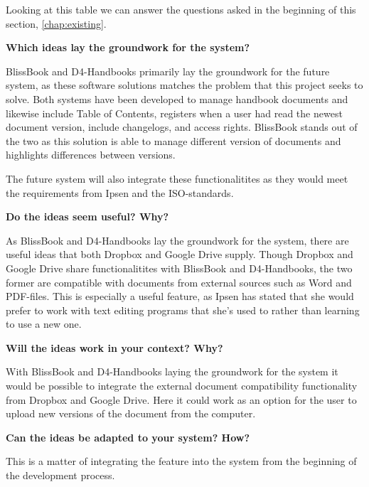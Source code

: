 Looking at this table we can answer the questions asked in the beginning of this section, \cref{chap:existing}.

\textbf{Which ideas lay the groundwork for the system?}

BlissBook and D4-Handbooks primarily lay the groundwork for the future system, as these software solutions matches the problem that this project seeks to solve.
Both systems have been developed to manage handbook documents and likewise include Table of Contents, registers when a user had read the newest document version, include changelogs, and access rights.
BlissBook stands out of the two as this solution is able to manage different version of documents and highlights differences between versions.

The future system will also integrate these functionalitites as they would meet the requirements from Ipsen and the ISO-standards.

\textbf{Do the ideas seem useful? Why?}

As BlissBook and D4-Handbooks lay the groundwork for the system, there are useful ideas that both Dropbox and Google Drive supply.
Though Dropbox and Google Drive share functionalitites with BlissBook and D4-Handbooks, the two former are compatible with documents from external sources such as Word and PDF-files.
This is especially a useful feature, as Ipsen has stated that she would prefer to work with text editing programs that she's used to rather than learning to use a new one.


\textbf{Will the ideas work in your context? Why?}

With BlissBook and D4-Handbooks laying the groundwork for the system it would be possible to integrate the external document compatibility functionality from Dropbox and Google Drive.
Here it could work as an option for the user to upload new versions of the document from the computer.


\textbf{Can the ideas be adapted to your system? How?}

This is a matter of integrating the feature into the system from the beginning of the development process.

